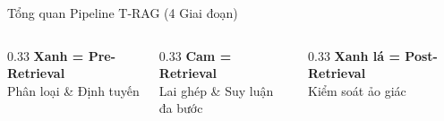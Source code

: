 \documentclass[aspectratio=169,11pt]{beamer}
\begin{document}
\begin{frame}{Tổng quan Pipeline T-RAG (4 Giai đoạn)}
\vspace{0.2cm}
\begin{columns}
\begin{column}{0.33\textwidth}
\centering\small
\textcolor{tragblue}{\textbf{Xanh = Pre-Retrieval}}\\Phân loại \& Định tuyến
\end{column}
\begin{column}{0.33\textwidth}
\centering\small
\textcolor{tragorange}{\textbf{Cam = Retrieval}}\\Lai ghép \& Suy luận đa bước
\end{column}
\begin{column}{0.33\textwidth}
\centering\small
\textcolor{traggreen}{\textbf{Xanh lá = Post-Retrieval}}\\Kiểm soát ảo giác
\end{column}
\end{columns}
\end{frame}
\end{document}
